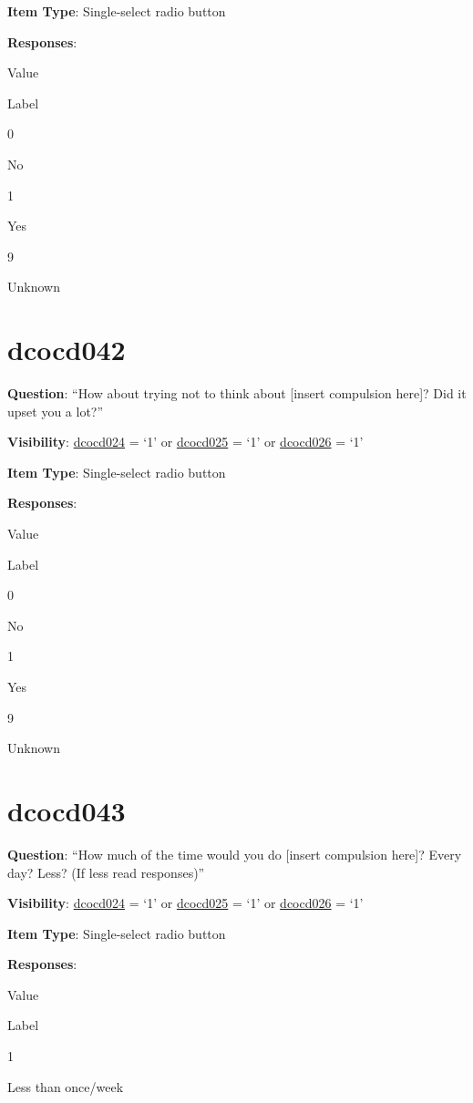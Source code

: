 \documentclass[]{book}
\begin{document}
\textbf{Item Type}: Single-select radio button

\textbf{Responses}:

Value

Label

0

No

1

Yes

9

Unknown

\hypertarget{dcocd042}{%
\section{dcocd042}\label{dcocd042}}

\textbf{Question}: ``How about trying not to think about {[}insert compulsion here{]}? Did it upset you a lot?''

\textbf{Visibility}: \protect\hyperlink{dcocd024}{dcocd024} = `1' or \protect\hyperlink{dcocd025}{dcocd025} = `1' or \protect\hyperlink{dcocd026}{dcocd026} = `1'

\textbf{Item Type}: Single-select radio button

\textbf{Responses}:

Value

Label

0

No

1

Yes

9

Unknown

\hypertarget{dcocd043}{%
\section{dcocd043}\label{dcocd043}}

\textbf{Question}: ``How much of the time would you do {[}insert compulsion here{]}? Every day? Less? (If less read responses)''

\textbf{Visibility}: \protect\hyperlink{dcocd024}{dcocd024} = `1' or \protect\hyperlink{dcocd025}{dcocd025} = `1' or \protect\hyperlink{dcocd026}{dcocd026} = `1'

\textbf{Item Type}: Single-select radio button

\textbf{Responses}:

Value

Label

1

Less than once/week
\end{document}

